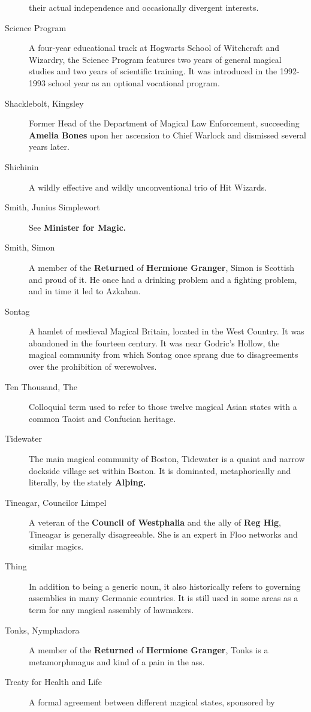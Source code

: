\begin{description}
their actual independence and occasionally divergent interests.
\item[Science Program]
A four-year educational track at Hogwarts School of Witchcraft and
Wizardry, the Science Program features two years of general magical
studies and two years of scientific training. It was introduced in the
1992-1993 school year as an optional vocational program.
\item[Shacklebolt, Kingsley]
Former Head of the Department of Magical Law Enforcement, succeeding
\textbf{Amelia Bones} upon her ascension to Chief Warlock and dismissed
several years later.
\item[Shichinin]
A wildly effective and wildly unconventional trio of Hit Wizards.
\item[Smith, Junius Simplewort]
See \textbf{Minister for Magic.}
\item[Smith, Simon]
A member of the \textbf{Returned }of \textbf{Hermione Granger}, Simon is
Scottish and proud of it. He once had a drinking problem and a fighting
problem, and in time it led to Azkaban.
\item[Sontag]
A hamlet of medieval Magical Britain, located in the West Country. It
was abandoned in the fourteen century. It was near Godric's Hollow, the
magical community from which Sontag once sprang due to disagreements
over the prohibition of werewolves.
\item[Ten Thousand, The]
Colloquial term used to refer to those twelve magical Asian states with
a common Taoist and Confucian heritage.
\item[Tidewater]
The main magical community of Boston, Tidewater is a quaint and narrow
dockside village set within Boston. It is dominated, metaphorically and
literally, by the stately \textbf{Alþing.}
\item[Tineagar, Councilor Limpel]
A veteran of the \textbf{Council of Westphalia} and the ally of
\textbf{Reg Hig}, Tineagar is generally disagreeable. She is an expert
in Floo networks and similar magics.
\item[Thing]
In addition to being a generic noun, it also historically refers to
governing assemblies in many Germanic countries. It is still used in
some areas as a term for any magical assembly of lawmakers.
\item[Tonks, Nymphadora]
A member of the \textbf{Returned }of \textbf{Hermione Granger}, Tonks is
a metamorphmagus and kind of a pain in the ass.
\item[Treaty for Health and Life]
A formal agreement between different magical states, sponsored by

\end{description}
